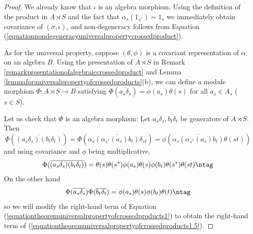 \begin{proof}
We already know that $\iota$ is an algebra morphism. Using the definition of the product in $A\rtimes S$ and the fact that $\alpha_s(1_{s^*})=1_s$ we immediately obtain covariance of $(\sigma,\iota)$, and non-degeneracy follows from Equation (\ref{equationnondegeneracyuniversalpropertycrossedproduct}).%
%

As for the universal property, suppose $(\theta,\phi)$ is a covariant representation of $\alpha$ on an algebra $B$. Using the presentation of $A\rtimes S$ in Remark \ref{remarkpresentationofalgebraiccrossedproduct} and Lemma \ref{lemmaforuniversalpropertyofcrossedproducts}(b), we can define a module morphism $\Phi:A\rtimes S\to B$ satisfying $\Phi(\overline{a_s\delta_s})=\phi(a_s)\theta(s)$ for all $a_s\in A_s$ ($s\in S$).

Let us check that $\Phi$ is an algebra morphism: Let $\overline{a_s\delta_s},\overline{b_t\delta_t}$ be generators of $A\rtimes S$. Then
\[\Phi(\overline{(a_s\delta_s)(b_t\delta_t)})=\Phi(\overline{\alpha_s(\alpha_{s^*}(a_s)b_t)\delta_{st}})=\phi(\overline{\alpha_s(\alpha_{s^*}(a_s)b_t)}\theta(st))\]
and using covariance and $\phi$ being multiplicative,
\[\Phi(\overline{(a_s\delta_s)(b_t\delta_t)})=\theta(s)\theta(s^*)\phi(a_s)\theta(s)\phi(b_t)\theta(s^*)\theta(st)\ntag\label{equationtheoremuniversalpropertyofcrossedproducts1}\]
On the other hand
\[\Phi(\overline{a_s\delta_s})\Phi(\overline{b_t\delta_t})=\phi(a_s)\theta(s)\phi(b_t)\theta(t)\ntag\label{equationtheoremuniversalpropertyofcrossedproducts1.5}\]
so we will modify the right-hand term of Equation (\ref{equationtheoremuniversalpropertyofcrossedproducts1}) to obtain the right-hand term of (\ref{equationtheoremuniversalpropertyofcrossedproducts1.5}).


\end{proof}
